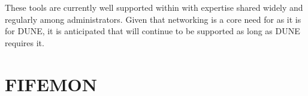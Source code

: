 \documentclass[../main-v1.tex]{subfiles}
\begin{document}
These tools are currently well supported within  with %
expertise shared widely and regularly among administrators.
Given %
that networking is a core need for  as it is for DUNE, it is anticipated that  %
will continue to be supported %
as long as DUNE requires it.

\section{FIFEMON}\label{is:fifemon}














\end{document}
